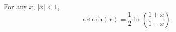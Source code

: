 For any $ x $, $ |x|<1 $,   
\[ \mathrm{artanh}(x)
 = \frac{1}{2} \ln \left ( \frac{1 + x}{1- x} \right ) . \]